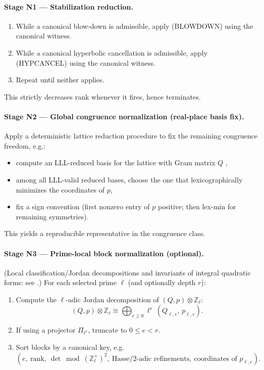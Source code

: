 \documentclass[11pt]{article}
\newcommand{\ZZ}{\mathbb{Z}}
\newcommand{\rank}{\mathrm{rank}}
\newcommand{\Rule}[1]{\textsc{(#1)}}
\begin{document}
\paragraph{Stage N1 --- Stabilization reduction.}
\begin{enumerate}[label=\arabic*.]
\item While a canonical blow-down is admissible, apply \Rule{BLOWDOWN} using the canonical witness.
\item While a canonical hyperbolic cancellation is admissible, apply \Rule{HYPCANCEL} using the canonical witness.
\item Repeat until neither applies.
\end{enumerate}
This strictly decreases rank whenever it fires, hence terminates.

\paragraph{Stage N2 --- Global congruence normalization (real-place basis fix).}
Apply a deterministic lattice reduction procedure to fix the remaining congruence freedom, e.g.:
\begin{itemize}
\item compute an LLL-reduced basis for the lattice with Gram matrix $Q$ \cite{LLL82},
\item among all LLL-valid reduced bases, choose the one that lexicographically minimizes the coordinates of $p$,
\item fix a sign convention (first nonzero entry of $p$ positive; then lex-min for remaining symmetries).
\end{itemize}
This yields a reproducible representative in the congruence class.

\paragraph{Stage N3 --- Prime-local block normalization (optional).}
(Local classification/Jordan decompositions and invariants of integral quadratic forms: see \cite{OM63,Ser73,CS99}.)
For each selected prime $\ell$ (and optionally depth $r$):
\begin{enumerate}[label=\arabic*.]
\item Compute the $\ell$-adic Jordan decomposition of $(Q,p)\otimes \ZZ_\ell$:
\[
(Q,p)\otimes\ZZ_\ell \cong \bigoplus_{e\ge 0}\ell^e\,(Q_{\ell,e},\,p_{\ell,e}).
\]
\item If using a projector $\Pi_{\ell^r}$, truncate to $0\le e<r$.
\item Sort blocks by a canonical key, e.g.
\[
(e,\ \rank,\ \det\bmod(\ZZ_\ell^\times)^2,\ \text{Hasse/2-adic refinements},\ \text{coordinates of }p_{\ell,e}).
\]
\end{enumerate}
\end{document}
